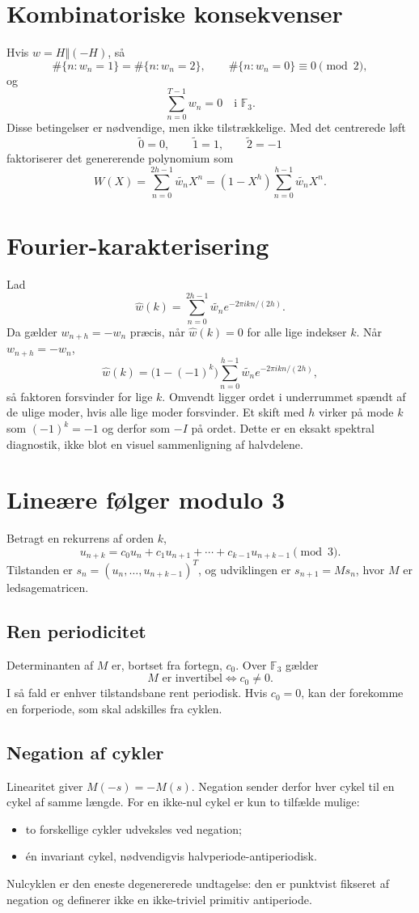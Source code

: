 \documentclass[11pt,a4paper]{article}
\newcommand{\F}{\mathbb{F}}
\newcommand{\oplusword}{\mathbin{\Vert}}
\newcommand{\centerlift}[1]{\widetilde{#1}}
\begin{document}
\section{Kombinatoriske konsekvenser}
Hvis $w=H\oplusword(-H)$, så
\[
\#\{n:w_n=1\}=\#\{n:w_n=2\},\qquad \#\{n:w_n=0\}\equiv0\pmod2,
\]
og
\[
\sum_{n=0}^{T-1}w_n=0\quad\text{i }\F_3.
\]
Disse betingelser er nødvendige, men ikke tilstrækkelige. Med det centrerede løft
\[
\centerlift0=0,\qquad \centerlift1=1,\qquad \centerlift2=-1
\]
faktoriserer det genererende polynomium som
\[
W(X)=\sum_{n=0}^{2h-1}\centerlift{w_n}X^n=(1-X^h)\sum_{n=0}^{h-1}\centerlift{w_n}X^n.
\]

\clearpage
\section{Fourier-karakterisering}
Lad
\[
\widehat w(k)=\sum_{n=0}^{2h-1}\centerlift{w_n}e^{-2\pi i kn/(2h)}.
\]
Da gælder $w_{n+h}=-w_n$ præcis, når $\widehat w(k)=0$ for alle lige indekser $k$. Når $w_{n+h}=-w_n$,
\[
\widehat w(k)=\bigl(1-(-1)^k\bigr)\sum_{n=0}^{h-1}\centerlift{w_n}e^{-2\pi i kn/(2h)},
\]
så faktoren forsvinder for lige $k$. Omvendt ligger ordet i underrummet spændt af de ulige moder, hvis alle lige moder forsvinder. Et skift med $h$ virker på mode $k$ som $(-1)^k=-1$ og derfor som $-I$ på ordet. Dette er en eksakt spektral diagnostik, ikke blot en visuel sammenligning af halvdelene.

\section{Lineære følger modulo 3}
Betragt en rekurrens af orden $k$,
\[
u_{n+k}=c_0u_n+c_1u_{n+1}+\cdots+c_{k-1}u_{n+k-1}\pmod3.
\]
Tilstanden er $s_n=(u_n,\ldots,u_{n+k-1})^T$, og udviklingen er $s_{n+1}=Ms_n$, hvor $M$ er ledsagematricen.

\subsection{Ren periodicitet}
Determinanten af $M$ er, bortset fra fortegn, $c_0$. Over $\F_3$ gælder
\[
M\text{ er invertibel}\iff c_0\neq0.
\]
I så fald er enhver tilstandsbane rent periodisk. Hvis $c_0=0$, kan der forekomme en forperiode, som skal adskilles fra cyklen.

\subsection{Negation af cykler}
Linearitet giver $M(-s)=-M(s)$. Negation sender derfor hver cykel til en cykel af samme længde. For en ikke-nul cykel er kun to tilfælde mulige:
\begin{itemize}
\item to forskellige cykler udveksles ved negation;
\item én invariant cykel, nødvendigvis halvperiode-antiperiodisk.
\end{itemize}
Nulcyklen er den eneste degenererede undtagelse: den er punktvist fikseret af negation og definerer ikke en ikke-triviel primitiv antiperiode.
\end{document}
